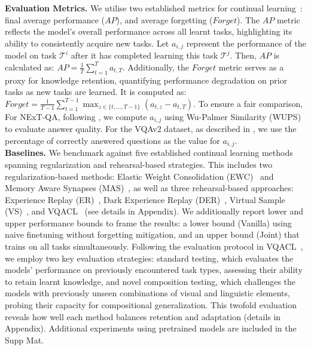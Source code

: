\noindent\textbf{Evaluation Metrics. }We utilise two established metrics for continual learning~\citep{zhang2023vqacl, Chaudhry_2018, lopezpaz2022gradientepisodicmemorycontinual}: final average performance ($AP$), and average forgetting ($Forget$). The $AP$ metric reflects the model's overall performance across all learnt tasks, highlighting its ability to consistently acquire new tasks. Let $a_{i,j}$ represent the performance of the model on task $\mathcal{T}^i$ after it has completed learning this task $\mathcal{T}^j$. Then, $AP$ is calculated as: $AP\!=\!\frac{1}{T} \sum_{t=1}^{T} a_{t,T}.$
Additionally, the $Forget$ metric serves as a proxy for knowledge retention, quantifying performance degradation on prior tasks as new tasks are learned. It is computed as:
$Forget\!=\!\frac{1}{T-1} \sum_{t=1}^{T-1} \max_{z \in \{t, \ldots, T-1\}} (a_{t,z} - a_{t,T}).$ To ensure a fair comparison, For NExT-QA, following \citep{zhang2023vqacl, xiao2021next}, we compute $a_{i,j}$ using Wu-Palmer Similarity (WUPS) to evaluate answer quality. For the VQAv2 dataset, as described in \citep{zhang2023vqacl}, we use the percentage of correctly answered questions as the value for $a_{i,j}$.\\
\noindent\textbf{Baselines. }We benchmark \qstmethodshort{} against five established continual learning methods spanning regularization and rehearsal-based strategies. This includes two regularization-based methods: Elastic Weight Consolidation (EWC)~\citep{kirkpatrick2017overcoming} and Memory Aware Synapses (MAS)~\citep{mas2018}, as well as three rehearsal-based approaches: Experience Replay (ER)~\citep{chaudhry2019tinyepisodicmemoriescontinual}, Dark Experience Replay (DER)~\citep{Chaudhry2019er}, Virtual Sample (VS)~\citep{Wan_2022_CVPR}, and VQACL~\citep{zhang2023vqacl} (see details in Appendix). We additionally report lower and upper performance bounds to frame the results: a lower bound (Vanilla) using naive finetuning without forgetting mitigation, and an upper bound (Joint) that trains on all tasks simultaneously. Following the evaluation protocol in VQACL~\citep{zhang2023vqacl}, we employ two key evaluation strategies: standard testing, which evaluates the models' performance on previously encountered task types, assessing their ability to retain learnt knowledge, and novel composition testing, which challenges the models with previously unseen combinations of visual and linguistic elements, probing their capacity for compositional  generalization. This twofold evaluation reveals how well each method balances retention and adaptation (details in Appendix). Additional experiments using pretrained models are included in the Supp Mat.

